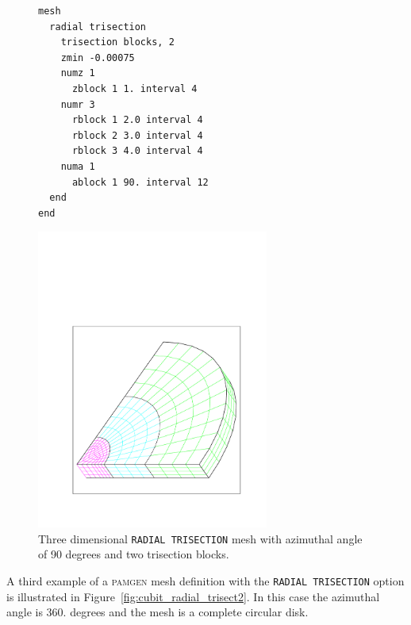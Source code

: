 \begin{figure}[htbp]
\centering
  \begin{minipage}[c]{0.4\linewidth}
    \centering
{\ttfamily \begin{verbatim}
mesh
  radial trisection
    trisection blocks, 2
    zmin -0.00075
    numz 1
      zblock 1 1. interval 4
    numr 3
      rblock 1 2.0 interval 4
      rblock 2 3.0 interval 4
      rblock 3 4.0 interval 4
    numa 1
      ablock 1 90. interval 12
  end
end
\end{verbatim}}
  \end{minipage}%
  \hfil
  \begin{minipage}[c]{0.6\linewidth}
    \centering
      \includegraphics[width=3.0in]{figures/cubit_radial_trisection}
  \end{minipage}
  \caption [A \texttt{RADIAL TRISECTION} mesh with three trisection blocks.] {Three dimensional \texttt{RADIAL TRISECTION} mesh with azimuthal
    angle of 90 degrees and two trisection blocks.}
  \label{fig:cubit_radial_trisect1}
\end{figure}


A third example of a \textsc{pamgen} mesh definition with the
\texttt{RADIAL TRISECTION} option is illustrated in
Figure~\ref{fig:cubit_radial_trisect2}. In this case the azimuthal
angle is 360. degrees and the mesh is a complete circular disk.

